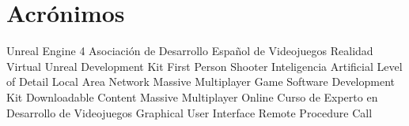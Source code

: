 \section*{Acrónimos}

{\small
\begin{acronym}[XXXXXXXX]
  	 {Unreal Engine 4}
  	 {Asociación de Desarrollo Español de Videojuegos}
  		 {Realidad Virtual}
   	 {Unreal Development Kit}
  	 {First Person Shooter}
  		 {Inteligencia Artificial}
  	 {Level of Detail}
  	 {Local Area Network}
  	 {Massive Multiplayer Game}
       {Software Development Kit}
  	 {Downloadable Content}
  	 {Massive Multiplayer Online}
  	 {Curso de Experto en Desarrollo de Videojuegos}
  	 {Graphical User Interface}
  	 {Remote Procedure Call}
\end{acronym}
}
